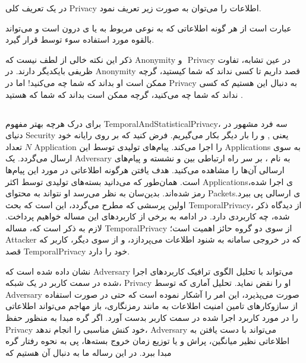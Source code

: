 
 در یک تعریف کلی 
\gls{Privacy}
اطلاعات را می‌توان به صورت زیر تعریف نمود. 
\begin{ntdefinition}
عبارت است از هر گونه اطلاعاتی که به نوعی مربوط به
  یا
  \footnotemark
  ی درون
    است و  می‌تواند بالقوه مورد استفاده سوء توسط
      قرار گیرد.
\end{ntdefinition}
ذکر این نکته خالی از لطف نیست که 
‎\gls{Anonymity}‎   و ‎ \gls{Privacy}‎
در عین تشابه، تفاوت ظریفی بایکدیگر دارند. در ‎\gls{Anonymity}‎ قصد داریم تا  کسی نداند که شما کیستید، گرچه ممکن است او بداند که شما چه می‌کنید! اما در ‎\gls{Privacy}‎ به دنبال این هستیم که کسی نداند که شما چه می‌کنید، گرچه ممکن است بداند که شما که هستید
\cite[صفحه ۳۴۱]{Stewart2013Network}.


\subsection{}
برای درک هرچه بهتر مفهوم
\gls{TemporalAndStatisticalPrivacy}،
سه فرد مشهور در دنیای
\gls{Security} یعنی ,  و 
را بار دیگر بکار می‌گیریم. فرض کنید که
بر روی رایانه خود تعداد 
$N$ \gls{Application}
را اجرا می‌کند. پیام‌های تولیدی توسط این
\glspl{Application}
به سوی
ارسال می‌گردد. یک
\gls{Adversary} به نام ،
بر سر راه ارتباطی بین 
‌و 
نشسته و پیام‌های ارسالی آن‌ها را  مشاهده می‌کنید. هدف  یافتن هرگونه اطلاعاتی در مورد این پیام‌ها است. همان‌طور که می‌دانید بسته‌های تولیدی توسط اکثر 
\glspl{Application}ی
اجرا شده، رمز شده‌اند. بدین‌سان به نظر می‌رسد او نتواند به محتوای 
\glspl{Packet}ی
ارسالی پی ببرد. 
اولین پرسشی که مطرح می‌گردد، این است که بحث ‎\gls{TemporalPrivacy}‎، از دیدگاه ذکر شده، چه کاربردی  دارد. در ادامه به برخی از کاربردهای این مساله خواهیم پرداخت. لازم به ذکر است که، مساله  ‎\gls{TemporalPrivacy}‎ از سوی دو گروه حائز اهمیت است؛ ‎\gls{Attacker}‎ که در خروجی سامانه به شنود اطلاعات می‌پردازد، و از سوی دیگر، کاربر که قصد ‎\gls{TemporalPrivacy} خود را دارد.

نشان داده شده است که 
\gls*{Adversary}
می‌تواند با تحلیل الگوی ترافیک کاربردهای اجرا شده در سمت کاربر در یک شبکه،
\gls*{Privacy}
او را نقض نماید. تحلیل آماری که توسط
\gls*{Adversary}
صورت می‌پذیرد، این امر را آشکار نموده است که حتی در صورت استفاده از سازوکارهای تامین امنیت اطلاعات به مانند رمزنگاری، باز مهاجم می‌تواند اطلاعاتی را در مورد کاربرد اجرا شده در سمت کاربر بدست آورد. اگر گره مبدا به منظور حفظ 
\gls*{Privacy}
خود کنش مناسبی را انجام ندهد، 
\gls*{Adversary}
می‌تواند با دست یافتن به اطلاعاتی نظیر میانگین، پراش و یا توزیع زمان خروج بسته‌ها، پی به نحوه رفتار گره مبدا ببرد. در این رساله ما به دنبال آن هستیم که 



